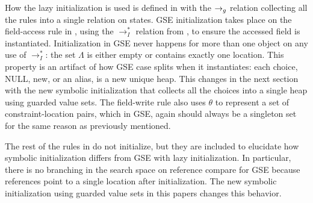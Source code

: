 How the lazy
initialization is used is defined in  with the $\rightarrow_{g}$ relation collecting all the rules into a single relation on states.  GSE initialization takes place on the field-access rule in ,
using the $\rightarrow_I^*$ relation from , to ensure the accessed field is
instantiated. Initialization in GSE never
happens for more than one object on any use of $\rightarrow_I^*$:
the set $\Lambda$ is either empty or contains exactly one location. This property is an artifact of how GSE case splits when it instantiates: each choice, NULL, new, or an alias, is a new unique heap. This changes in the next section with the new symbolic initialization that collects all the choices into a single heap using guarded value sets. The field-write rule also uses $\theta$ to represent a set of constraint-location pairs, which in GSE, again should always be a singleton set for the same reason as previously mentioned.

The rest of the rules in  do not initialize, but they are included to elucidate how symbolic initialization differs from GSE with lazy initialization. In particular, there is no branching in the search space on reference compare for GSE because references point to a single location after initialization. The new symbolic initialization using guarded value sets in this papers changes this behavior. 



